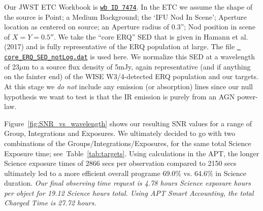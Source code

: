 \smallskip \smallskip 
\noindent
Our JWST ETC Workbook is
\href{https://jwst.etc.stsci.edu/workbook.html?wb_id=7474}{{\tt wb ID
7474}}.  In the ETC we assume the shape of the source is Point; a
Medium Background; the `IFU Nod In Scene'; Aperture location as
centered on source; an Aperture radius of 0.3''; Nod position in scene
of $X=Y=0.5''$.
We take the ``core ERQ'' SED that is given in Hamann et al. (2017) and
is fully representative of the ERQ population at large.  The file
\href{https://github.com/d80b2t/JWST_ERS/blob/master/ETC_calcs/core_ERQ_SED_notLog.dat}{\tt
core\_ERQ\_SED\_notLog.dat} is used here.  We normalize this SED at a
wavelength of 23$\mu$m to a source flux density of 5mJy, again
representative (and if anything on the fainter end) of the WISE
W3/4-detected ERQ population and our targets.  At this stage we {\it
do not} include any emission (or absorption) lines since our null
hypothesis we want to test is that the IR emission is purely from an AGN power-law.

\smallskip \smallskip 
\noindent
Figure~\ref{fig:SNR_vs_wavelength} shows our resulting SNR 
values for a range of Group, Integrations and Exposures. 
We ultimately decided to go with two combinations of the
Groups/Integrations/Exposures, for the same total Science Exposure
time; see~Table~\ref{tab:targets}.  Using calculations in the APT, the
longer Science exposure times of 2866 secs per observation compared to
2150 secs ultimately led to a more efficient overall programe 69.0\%
vs. 64.6\% in Science duration.
{\it Our final observing time request is 4.78 hours Science exposure hours 
per object for 19.12 Science hours total. 
Using APT Smart Accounting, the total Charged Time is 27.72 hours.}

